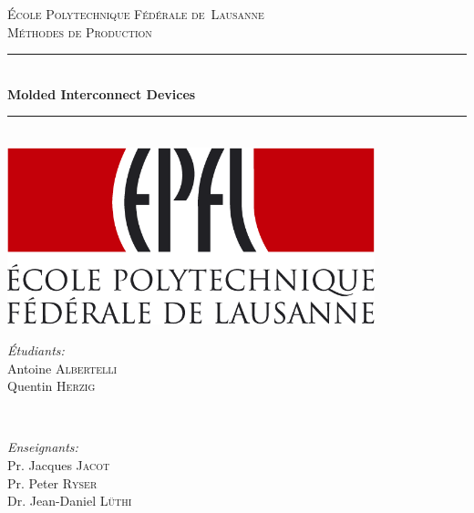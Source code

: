 \begin{titlepage}

\newcommand{\HRule}{\rule{\linewidth}{0.5mm}} %

\center %
\textsc{\LARGE École Polytechnique Fédérale de~Lausanne}\\[1.5cm] 
\textsc{\Large Méthodes de Production}\\[0.5cm] %

\HRule \\[0.4cm]
{ \huge \bfseries Molded Interconnect Devices}\\[0.4cm] %
\HRule \\[1.5cm]
 
\includegraphics[width=0.8\textwidth]{images/epfl_logo}\\[2cm] 


\vfill %
\begin{minipage}{0.55\textwidth}
\begin{flushleft} \large
\emph{Étudiants:}\\
Antoine \textsc{Albertelli}\\ 
Quentin \textsc{Herzig}
\end{flushleft}
\end{minipage}
~
\begin{minipage}{0.4\textwidth}
\begin{flushleft} \large
\emph{Enseignants:} \\
Pr. Jacques \textsc{Jacot} \\
Pr. Peter \textsc{Ryser}\\
Dr. Jean-Daniel \textsc{Lüthi}
\end{flushleft}
\end{minipage}\\[2cm]



\end{titlepage}
